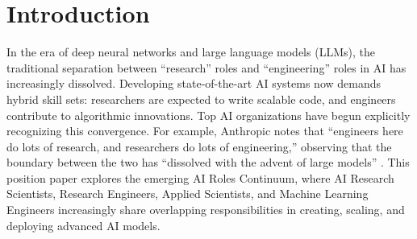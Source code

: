 \documentclass[pdflatex,sn-mathphys-num]{sn-jnl}%
\theoremstyle{thmstyleone}%
\theoremstyle{thmstyletwo}%
\theoremstyle{thmstylethree}%
\begin{document}
\maketitle

\section{Introduction}
In the era of deep neural networks and large language models (LLMs), the traditional separation between ``research'' roles and ``engineering'' roles in AI has increasingly dissolved. Developing state-of-the-art AI systems now demands hybrid skill sets: researchers are expected to write scalable code, and engineers contribute to algorithmic innovations. Top AI organizations have begun explicitly recognizing this convergence. For example, Anthropic notes that “engineers here do lots of research, and researchers do lots of engineering,” observing that the boundary between the two has “dissolved with the advent of large models” \cite{AnthropicCareers2023}. This position paper explores the emerging AI Roles Continuum, where AI Research Scientists, Research Engineers, Applied Scientists, and Machine Learning Engineers increasingly share overlapping responsibilities in creating, scaling, and deploying advanced AI models.
\end{document}
